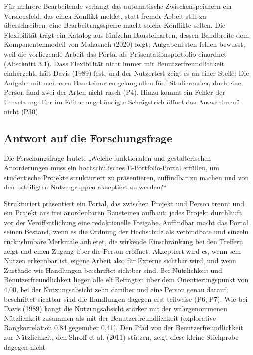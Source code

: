 Für mehrere Bearbeitende verlangt das automatische Zwischenspeichern ein Versionsfeld, das einen Konflikt meldet, statt fremde Arbeit still zu überschreiben; eine Bearbeitungssperre macht solche Konflikte selten. Die Flexibilität trägt ein Katalog aus fünfzehn Bausteinarten, dessen Bandbreite dem Komponentenmodell von Mahasneh (2020) folgt; Aufgabenlisten fehlen bewusst, weil die vorliegende Arbeit das Portal als Präsentationsportfolio einordnet (Abschnitt 3.1). Dass Flexibilität nicht immer mit Benutzerfreundlichkeit einhergeht, hält Davis (1989) fest, und der Nutzertest zeigt es an einer Stelle: Die Aufgabe mit mehreren Bausteinarten gelang allen fünf Studierenden, doch eine Person fand zwei der Arten nicht rasch (P4). Hinzu kommt ein Fehler der Umsetzung: Der im Editor angekündigte Schrägstrich öffnet das Auswahlmenü nicht (P30).

\subsection{Antwort auf die Forschungsfrage}

Die Forschungsfrage lautet: „Welche funktionalen und gestalterischen Anforderungen muss ein hochschulisches E-Portfolio-Portal erfüllen, um studentische Projekte strukturiert zu präsentieren, auffindbar zu machen und von den beteiligten Nutzergruppen akzeptiert zu werden?“

Strukturiert präsentiert ein Portal, das zwischen Projekt und Person trennt und ein Projekt aus frei anordenbaren Bausteinen aufbaut; jedes Projekt durchläuft vor der Veröffentlichung eine redaktionelle Freigabe. Auffindbar macht das Portal seinen Bestand, wenn es die Ordnung der Hochschule als verbindbare und einzeln rücknehmbare Merkmale anbietet, die wirkende Einschränkung bei den Treffern zeigt und einen Zugang über die Person eröffnet. Akzeptiert wird es, wenn sein Nutzen erkennbar ist, eigene Arbeit also für Externe sichtbar wird, und wenn Zustände wie Handlungen beschriftet sichtbar sind. Bei Nützlichkeit und Benutzerfreundlichkeit liegen alle elf Befragten über dem Orientierungspunkt von 4,00, bei der Nutzungsabsicht zehn darüber und eine Person genau darauf; beschriftet sichtbar sind die Handlungen dagegen erst teilweise (P6, P7). Wie bei Davis (1989) hängt die Nutzungsabsicht stärker mit der wahrgenommenen Nützlichkeit zusammen als mit der Benutzerfreundlichkeit (explorative Rangkorrelation 0,84 gegenüber 0,41). Den Pfad von der Benutzerfreundlichkeit zur Nützlichkeit, den Shroff et al. (2011) stützen, zeigt diese kleine Stichprobe dagegen nicht.


